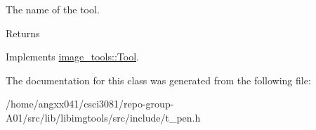 The name of the tool. 

\begin{DoxyReturn}{Returns}

\end{DoxyReturn}


Implements \hyperlink{classimage__tools_1_1Tool_a251c179e3ac9756d08fbcd082750f8a9}{image\+\_\+tools\+::\+Tool}.



The documentation for this class was generated from the following file\+:\begin{DoxyCompactItemize}
\item 
/home/angxx041/csci3081/repo-\/group-\/\+A01/src/lib/libimgtools/src/include/t\+\_\+pen.\+h\end{DoxyCompactItemize}
